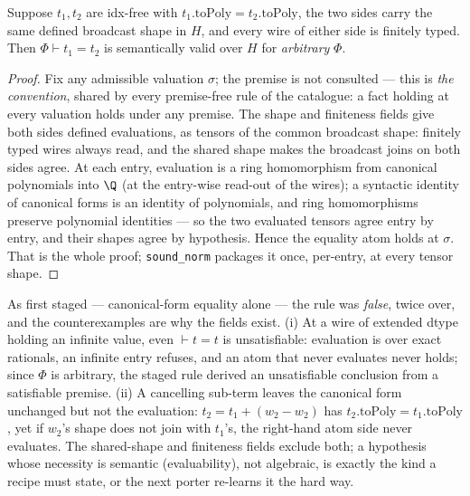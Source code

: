 \begin{bprop}\label{prop:norm-sound}
Suppose $t_1, t_2$ are idx-free with $t_1.\mathrm{toPoly} =
t_2.\mathrm{toPoly}$, the two sides carry the same defined broadcast
shape in $H$, and every wire of either side is finitely typed. Then
$\Phi \vdash t_1 = t_2$ is semantically valid over $H$ for
\emph{arbitrary} $\Phi$.
\end{bprop}
\begin{proof}
Fix any admissible valuation $\sigma$; the premise is not consulted ---
this is \emph{the  convention}, shared by every
premise-free rule of the catalogue: a fact holding at every valuation
holds under any premise. The shape and finiteness fields give both
sides defined evaluations, as tensors of the common broadcast shape:
finitely typed wires always read, and the shared shape makes the
broadcast joins on both sides agree. At each entry, evaluation is a
ring homomorphism from canonical polynomials into $\Q$ (at the
entry-wise read-out of the wires); a syntactic identity of canonical
forms is an identity of polynomials, and ring homomorphisms preserve
polynomial identities --- so the two evaluated tensors agree entry by
entry, and their shapes agree by hypothesis. Hence the equality atom
holds at $\sigma$. That is the whole proof; \texttt{sound\_norm}
packages it once, per-entry, at every tensor shape.
\end{proof}

\begin{bremark}
\label{rem:norm-b13}
As first staged --- canonical-form equality alone --- the rule was
\emph{false}, twice over, and the counterexamples are why the fields
exist. (i) At a wire of extended dtype holding an infinite value, even
$\vdash t = t$ is unsatisfiable: evaluation is over exact rationals,
an infinite entry refuses, and an atom that never evaluates never
holds; since $\Phi$ is arbitrary, the staged rule derived an
unsatisfiable conclusion from a satisfiable premise. (ii) A cancelling
sub-term leaves the canonical form unchanged but not the evaluation:
$t_2 = t_1 + (w_2 - w_2)$ has $t_2.\mathrm{toPoly} =
t_1.\mathrm{toPoly}$, yet if $w_2$'s shape does not join with $t_1$'s,
the right-hand atom side never evaluates. The shared-shape and
finiteness fields exclude both; a hypothesis whose necessity is
semantic (evaluability), not algebraic, is exactly the kind a recipe
must state, or the next porter re-learns it the hard way.
\end{bremark}

